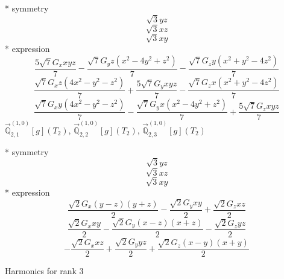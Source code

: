 \documentclass[fleqn,8pt]{jsarticle}
\begin{document}
\noindent\quad ** symmetry
\begin{dmath*}
\sqrt{3} y z
\end{dmath*}
\begin{dmath*}
\sqrt{3} x z
\end{dmath*}
\begin{dmath*}
\sqrt{3} x y
\end{dmath*}
\noindent\quad ** expression
\begin{dmath*}
\frac{5 \sqrt{7} G_{x} x y z}{7} - \frac{\sqrt{7} G_{y} z \left(x^{2} - 4 y^{2} + z^{2}\right)}{7} - \frac{\sqrt{7} G_{z} y \left(x^{2} + y^{2} - 4 z^{2}\right)}{7}
\end{dmath*}
\begin{dmath*}
\frac{\sqrt{7} G_{x} z \left(4 x^{2} - y^{2} - z^{2}\right)}{7} + \frac{5 \sqrt{7} G_{y} x y z}{7} - \frac{\sqrt{7} G_{z} x \left(x^{2} + y^{2} - 4 z^{2}\right)}{7}
\end{dmath*}
\begin{dmath*}
\frac{\sqrt{7} G_{x} y \left(4 x^{2} - y^{2} - z^{2}\right)}{7} - \frac{\sqrt{7} G_{y} x \left(x^{2} - 4 y^{2} + z^{2}\right)}{7} + \frac{5 \sqrt{7} G_{z} x y z}{7}
\end{dmath*}
\noindent\quad $\vec{\mathbb{Q}}_{2,1}^{(1,0)}[g](T_{2})$, $\vec{\mathbb{Q}}_{2,2}^{(1,0)}[g](T_{2})$, $\vec{\mathbb{Q}}_{2,3}^{(1,0)}[g](T_{2})$

\noindent\quad ** symmetry
\begin{dmath*}
\sqrt{3} y z
\end{dmath*}
\begin{dmath*}
\sqrt{3} x z
\end{dmath*}
\begin{dmath*}
\sqrt{3} x y
\end{dmath*}
\noindent\quad ** expression
\begin{dmath*}
\frac{\sqrt{2} G_{x} \left(y - z\right) \left(y + z\right)}{2} - \frac{\sqrt{2} G_{y} x y}{2} + \frac{\sqrt{2} G_{z} x z}{2}
\end{dmath*}
\begin{dmath*}
\frac{\sqrt{2} G_{x} x y}{2} - \frac{\sqrt{2} G_{y} \left(x - z\right) \left(x + z\right)}{2} - \frac{\sqrt{2} G_{z} y z}{2}
\end{dmath*}
\begin{dmath*}
- \frac{\sqrt{2} G_{x} x z}{2} + \frac{\sqrt{2} G_{y} y z}{2} + \frac{\sqrt{2} G_{z} \left(x - y\right) \left(x + y\right)}{2}
\end{dmath*}

\noindent * Harmonics for rank 3
\end{document}
